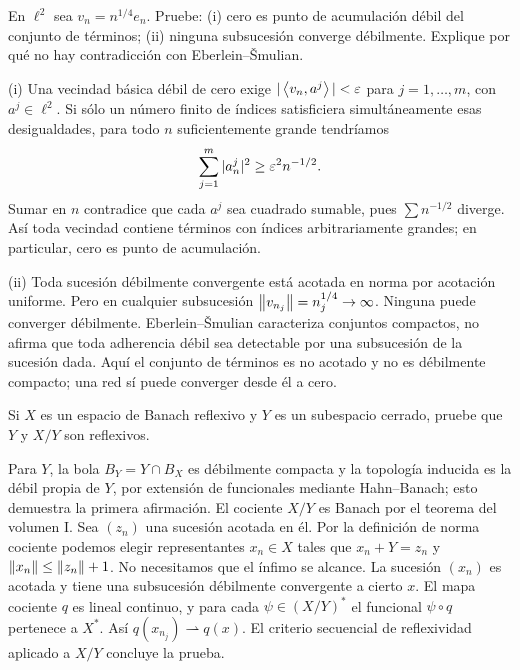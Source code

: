 \begin{ejercicio}\label{ej:v3-l17-5}
En $\ell^2$ sea $v_n=n^{1/4}e_n$. Pruebe: (i) cero es punto de acumulación débil del conjunto de términos; (ii) ninguna subsucesión converge débilmente. Explique por qué no hay contradicción con Eberlein--Šmulian.
\end{ejercicio}
\begin{solucion}
(i) Una vecindad básica débil de cero exige $|\left\langle v_n,a^j\right\rangle|<\varepsilon$ para $j=1,\ldots,m$, con $a^j\in\ell^2$. Si sólo un número finito de índices satisficiera simultáneamente esas desigualdades, para todo $n$ suficientemente grande tendríamos
\[
 \sum_{j=1}^m|a_n^j|^2\geq\varepsilon^2n^{-1/2}.
\]
Sumar en $n$ contradice que cada $a^j$ sea cuadrado sumable, pues $\sum n^{-1/2}$ diverge. Así toda vecindad contiene términos con índices arbitrariamente grandes; en particular, cero es punto de acumulación.

(ii) Toda sucesión débilmente convergente está acotada en norma por acotación uniforme. Pero en cualquier subsucesión $\left\lVert v_{n_j}\right\rVert=n_j^{1/4}\to\infty$. Ninguna puede converger débilmente. Eberlein--Šmulian caracteriza conjuntos compactos, no afirma que toda adherencia débil sea detectable por una subsucesión de la sucesión dada. Aquí el conjunto de términos es no acotado y no es débilmente compacto; una red sí puede converger desde él a cero.
\end{solucion}

\begin{ejercicio}\label{ej:v3-l18-1}
Si $X$ es un espacio de Banach reflexivo y $Y$ es un subespacio cerrado, pruebe que $Y$ y $X/Y$ son reflexivos.
\end{ejercicio}
\begin{solucion}
Para $Y$, la bola $B_Y=Y\cap B_X$ es débilmente compacta y la topología inducida es la débil propia de $Y$, por extensión de funcionales mediante Hahn--Banach; esto demuestra la primera afirmación. El cociente $X/Y$ es Banach por el teorema del volumen I. Sea $(z_n)$ una sucesión acotada en él. Por la definición de norma cociente podemos elegir representantes $x_n\in X$ tales que $x_n+Y=z_n$ y $\left\lVert x_n\right\rVert\leq\left\lVert z_n\right\rVert+1$. No necesitamos que el ínfimo se alcance. La sucesión $(x_n)$ es acotada y tiene una subsucesión débilmente convergente a cierto $x$. El mapa cociente $q$ es lineal continuo, y para cada $\psi\in(X/Y)^*$ el funcional $\psi\circ q$ pertenece a $X^*$. Así $q(x_{n_j})\rightharpoonup q(x)$. El criterio secuencial de reflexividad aplicado a $X/Y$ concluye la prueba.
\end{solucion}


